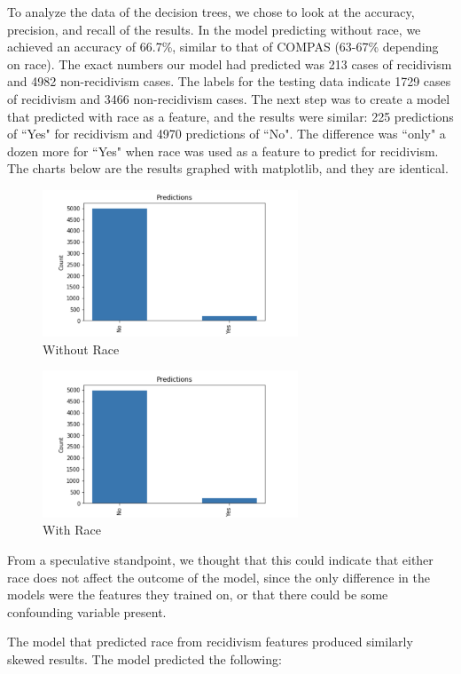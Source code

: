 \documentclass[11pt, sigconf]{acmart}
\begin{document}
To analyze the data of the decision trees, we chose to look at the accuracy, precision, and recall of the results. In the model predicting without race, we achieved an accuracy of 66.7\%, similar to that of COMPAS (63-67\% depending on race). The exact numbers our model had predicted was 213 cases of recidivism and 4982 non-recidivism cases. The labels for the testing data indicate 1729 cases of recidivism and 3466 non-recidivism cases. The next step was to create a model that predicted with race as a feature, and the results were similar: 225 predictions of ``Yes" for recidivism and 4970 predictions of ``No". The difference was ``only" a dozen more for ``Yes" when race was used as a feature to predict for recidivism. The charts below are the results graphed with matplotlib, and they are identical. 


\begin{figure}[h] 	
\centering
\includegraphics[width=3in]{2.png}
\caption{Without Race}
\end{figure}

\begin{figure}[h] 	
\centering
\includegraphics[width=3in]{3.png}
\caption{With Race}
\end{figure}

From a speculative standpoint, we thought that this could indicate that either race does not affect the outcome of the model, since the only difference in the models were the features they trained on, or that there could be some confounding variable present. 

The model that predicted race from recidivism features produced similarly skewed results. The model predicted the following:
\end{document}
